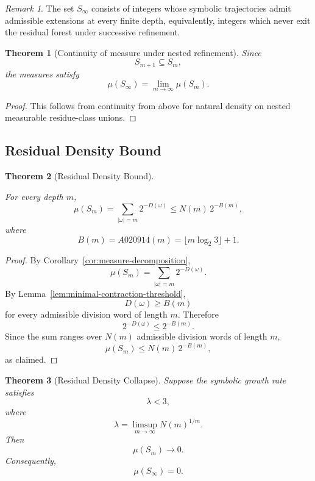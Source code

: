 \documentclass[12pt, oneside]{article}
\numberwithin{equation}{section}
\theoremstyle{definition}
\theoremstyle{plain}
\newtheorem{theorem}{Theorem}[section]
\theoremstyle{remark}
\newtheorem*{remark}{Remark}
\begin{document}
\begin{remark}
The set \(S_\infty\) consists of integers whose symbolic trajectories
admit admissible extensions at every finite depth, equivalently,
integers which never exit the residual forest under successive refinement.
\end{remark}

\begin{theorem}[Continuity of measure under nested refinement]
\label{thm:nested-measure}
Since
\[
S_{m+1}\subseteq S_m,
\]
the measures satisfy
\[
\mu(S_\infty) = \lim_{m\to\infty}\mu(S_m).
\]
\end{theorem}

\begin{proof}
This follows from continuity from above for natural density on
nested measurable residue-class unions.
\end{proof}

\subsection{Residual Density Bound}

\begin{theorem}[Residual Density Bound]
\label{thm:residual-density-bound}

For every depth \(m\),
\[
\mu(S_m) = \sum_{|\omega|=m}2^{-D(\omega)} \le N(m)\,2^{-B(m)},
\]
where
\[
B(m)=A020914(m) = \lfloor m\log_2 3\rfloor+1.
\]
\end{theorem}

\begin{proof}
By Corollary~\ref{cor:measure-decomposition},
\[
\mu(S_m) = \sum_{|\omega|=m} 2^{-D(\omega)}.
\]
By Lemma~\ref{lem:minimal-contraction-threshold},
\[
D(\omega)\ge B(m)
\]
for every admissible division word of length \(m\). Therefore
\[
2^{-D(\omega)} \le 2^{-B(m)}.
\]
Since the sum ranges over \(N(m)\) admissible division words of length \(m\),
\[
\mu(S_m) \le N(m)\,2^{-B(m)},
\]
as claimed.
\end{proof}

\begin{theorem}[Residual Density Collapse]
\label{thm:residual-density-collapse}
Suppose the symbolic growth rate satisfies
\[
\lambda<3,
\]
where
\[
\lambda = \limsup_{m\to\infty} N(m)^{1/m}.
\]
Then
\[
\mu(S_m) \longrightarrow 0.
\]
Consequently,
\[
\mu(S_\infty) = 0.
\]
\end{theorem}
\end{document}
